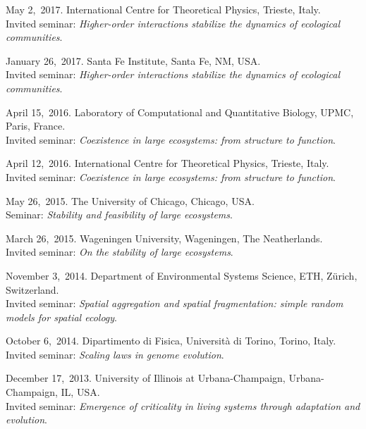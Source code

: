 \documentclass[10pt]{article}
\begin{document}
\begin{outerlist}
    \item May 2,~2017. 
	International Centre for Theoretical Physics, Trieste, Italy.\\
	Invited seminar: \emph{Higher-order interactions stabilize the dynamics of ecological communities}. %

    \item January 26,~2017.
	 Santa Fe Institute, Santa Fe, NM, USA.\\
	Invited seminar: \emph{Higher-order interactions stabilize the dynamics of ecological communities}. %

    \item April 15,~2016. Laboratory of Computational and Quantitative Biology, UPMC, Paris, France.\\
	Invited seminar: 
	\emph{Coexistence in large ecosystems: from structure to function}. %

    \item April 12,~2016.
	International Centre for Theoretical Physics, Trieste, Italy.\\
    Invited seminar: 
	\emph{Coexistence in large ecosystems: from structure to function}. %
	
    \item May 26,~2015.
	 The University of Chicago, Chicago, USA.\\
	Seminar: 
	\emph{Stability and feasibility of large ecosystems}. %
	
    \item March 26,~2015.
	 Wageningen University, Wageningen, The Neatherlands.\\
	Invited seminar: 
	\emph{On the stability of large ecosystems}. %
	

    \item November 3,~2014.
	 Department of Environmental Systems Science, ETH, Z\"urich, Switzerland.\\
	Invited seminar: 
	\emph{Spatial aggregation and spatial fragmentation: simple random models for spatial ecology}. %
	

    \item October 6,~2014.
	 Dipartimento di Fisica, Universit\`a di Torino, Torino, Italy.\\
	Invited seminar: 
	\emph{Scaling laws in genome evolution}. %

    \item December 17,~2013.
	 University of Illinois at Urbana-Champaign, Urbana-Champaign, IL, USA.\\
	Invited seminar: 
	\emph{Emergence of criticality in living systems through adaptation and evolution}. %
	


\end{outerlist}
\end{document}
